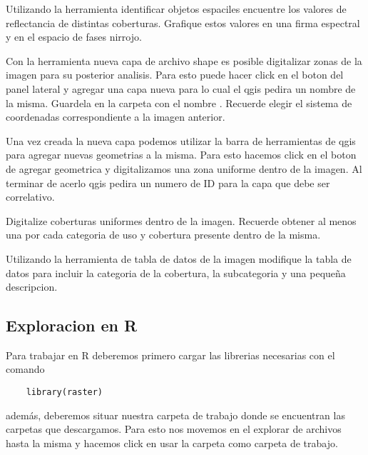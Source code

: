 \documentclass[a4paper]{article}
\begin{document}
 \begin{act}
    Utilizando la herramienta identificar objetos espaciles encuentre los
    valores de reflectancia de distintas coberturas. Grafique estos  valores en
    una firma espectral y en el espacio de fases nirrojo.
 \end{act}

 Con la herramienta nueva capa de archivo shape es posible digitalizar zonas de
 la imagen para su posterior analisis. Para esto puede hacer click en el boton
 del panel lateral y agregar una capa nueva para lo cual el qgis pedira un
 nombre de la misma. Guardela en la carpeta  con el nombre
 . Recuerde elegir el sistema de coordenadas correspondiente a
 la imagen anterior.

 Una vez creada la nueva capa podemos utilizar la barra de herramientas de qgis
 para agregar nuevas geometrias a la misma. Para esto hacemos click en el boton
 de agregar geometrica y digitalizamos una zona uniforme dentro de la imagen. Al
 terminar de acerlo qgis pedira un numero de ID para la capa que debe ser
 correlativo.
 
 \begin{act}
    Digitalize coberturas uniformes dentro de la imagen. Recuerde obtener al
    menos una por cada categoria de uso y cobertura presente dentro de la misma.
 \end{act}

 \begin{act}
    Utilizando la herramienta de tabla de datos de la imagen modifique la tabla
    de datos para incluir la categoria de la cobertura, la subcategoria y una 
    pequeña descripcion.
 \end{act}


\subsection{Exploracion en R}
\label{sub:fep:r}
 Para trabajar en R deberemos primero cargar las librerias necesarias con el
 comando

 \begin{lstlisting}
    library(raster)
 \end{lstlisting}

 además, deberemos situar nuestra carpeta de trabajo donde se encuentran las
 carpetas que descargamos. Para esto nos movemos en el explorar de archivos
 hasta la misma y hacemos click en usar la carpeta como carpeta de trabajo.
\end{document}
